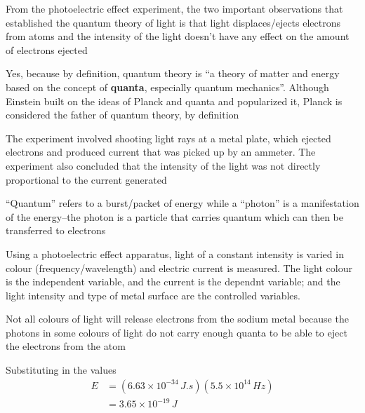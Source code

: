 \begin{solutions}
    \item From the photoelectric effect experiment, the two important observations that established
        the quantum theory of light is that light displaces/ejects electrons from atoms and
        the intensity of the light doesn't have any effect on the amount of electrons ejected
    \item Yes, because by definition, quantum theory is ``a theory of matter and energy based
        on the concept of \textbf{quanta}, especially quantum mechanics''. Although Einstein built
        on the ideas of Planck and quanta and popularized it, Planck is considered the father
        of quantum theory, by definition
    \item The experiment involved shooting light rays at a metal plate, which ejected electrons
        and produced current that was picked up by an ammeter. The experiment also concluded that
        the intensity of the light was not directly proportional to the current generated
    \item ``Quantum'' refers to a burst/packet of energy while a ``photon'' is a manifestation of
        the energy--the photon is a particle that carries quantum which can then be transferred 
        to electrons
    \item 
        \begin{enum-alph}
            \item Using a photoelectric effect apparatus, light of a constant intensity is varied
                in colour (frequency/wavelength) and electric current is measured. The light colour
                is the independent variable, and the current is the dependnt variable; and the
                light intensity and type of metal surface are the controlled variables.
            \item Not all colours of light will release electrons from the sodium metal because
                the photons in some colours of light do not carry enough quanta to be able to
                eject the electrons from the atom
        \end{enum-alph}
    \item 
        \begin{enum-alph}
        \item Substituting in the values
            \begin{align*}
                E&=(6.63\times10^{-34}\,\si{J.s})(5.5\times10^{14}\,\si{Hz})\\
                 &=3.65\times10^{-19}\,\si{J}

\end{align*}
\end{enum-alph}
\end{solutions}
